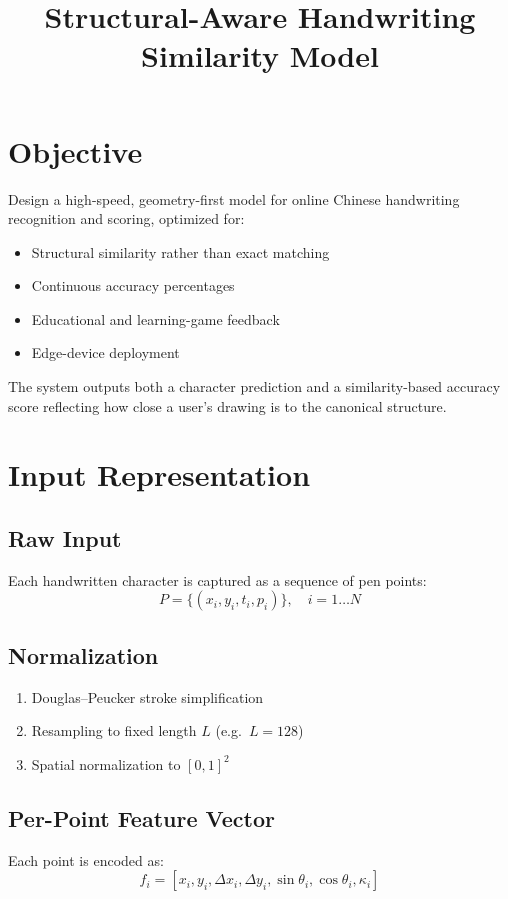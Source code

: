 \documentclass[11pt]{article}
\title{Structural-Aware Handwriting Similarity Model}
\author{}
\date{}
\begin{document}
\maketitle

\section{Objective}
Design a high-speed, geometry-first model for online Chinese handwriting recognition and scoring, optimized for:
\begin{itemize}
\item Structural similarity rather than exact matching
\item Continuous accuracy percentages
\item Educational and learning-game feedback
\item Edge-device deployment
\end{itemize}

The system outputs both a character prediction and a similarity-based accuracy score reflecting how close a user’s drawing is to the canonical structure.

\section{Input Representation}

\subsection{Raw Input}
Each handwritten character is captured as a sequence of pen points:
\[
P = \{(x_i, y_i, t_i, p_i)\}, \quad i = 1 \dots N
\]

\subsection{Normalization}
\begin{enumerate}
\item Douglas--Peucker stroke simplification
\item Resampling to fixed length $L$ (e.g.\ $L=128$)
\item Spatial normalization to $[0,1]^2$
\end{enumerate}

\subsection{Per-Point Feature Vector}
Each point is encoded as:
\[
f_i = [x_i, y_i, \Delta x_i, \Delta y_i, \sin\theta_i, \cos\theta_i, \kappa_i]
\]
\end{document}
